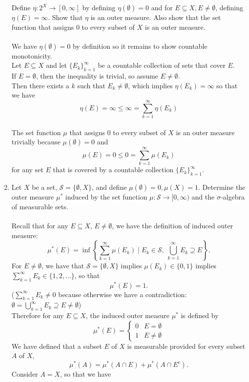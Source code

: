 \begin{enumerate}
	Define $\eta:2^X\to[0,\infty]$ by defining $\eta(\emptyset)=0$ and for $E\subseteq X,E\neq\emptyset$, defining $\eta(E)=\infty$.
	Show that $\eta$ is an outer measure.
	Also show that the set function that assigns $0$ to every subset of $X$ is an outer measure.\\
	\\We have $\eta(\emptyset)=0$ by definition so it remains to show countable monotonicity.
	\\Let $E\subseteq X$ and let $\{E_k\}_{k=1}^\infty$ be a countable collection of sets that cover $E$.
	\\If $E=\emptyset$, then the inequality is trivial, so assume $E\neq\emptyset$.
	\\Then there exists a $k$ such that $E_k\neq\emptyset$, which implies $\eta(E_k)=\infty$ so that we have 
	\[
		\eta(E)=\infty\le\infty=\sum_{k=1}^\infty\eta(E_k)
	\]
	\\The set function $\mu$ that assigns $0$ to every subset of $X$ is an outer measure trivially because $\mu(\emptyset)=0$ and
	\[
		\mu(E)=0\le0=\sum_{k=1}^\infty\mu(E_k)
	\]
	for any set $E$ that is covered by a countable collection $\{E_k\}_{k=1}^\infty$.
	\item Let $X$ be a set, $\mathcal{S}=\{\emptyset,X\}$, and define $\mu(\emptyset)=0,\mu(X)=1$. 
	Determine the outer measure $\mu^*$ induced by the set function $\mu:\mathcal{S}\to[0,\infty)$ and the $\sigma$-algebra of measurable sets.\\
	\\Recall that for any $E\subseteq X$, $E\neq\emptyset$, we have the definition of induced outer measure:
	\[
		\mu^*(E)=\inf\left\{\sum_{k=1}^\infty\mu(E_k)\mid E_k\in\mathcal{S},\ \bigcup_{k=1}^\infty E_k\supseteq E\right\}.
	\]
	For $E\neq\emptyset$, we have that $\mathcal{S}=\{\emptyset,X\}$ implies $\mu(E_k)\in\{0,1\}$ implies $\sum_{k=1}^\infty E_k\in\{1,2,\dots\}$, so that
	\[
		\mu^*(E)=1.
	\]
	($\sum_{k=1}^\infty E_k\neq0$ because otherwise we have a contradiction: $\emptyset=\bigcup_{k=1}^\infty E_k\supseteq E\neq\emptyset$)
	\\Therefore for any $E\subseteq X$, the induced outer measure $\mu^*$ is defined by
	\[
		\mu^*(E)=
		\begin{cases}
			0&E=\emptyset\\
			1&E\neq\emptyset
		\end{cases}
	\]
	We have defined that a subset $E$ of $X$ is measurable provided for every subset $A$ of $X$,
	\[
		\mu^*(A)=\mu^*(A\cap E)+\mu^*(A\cap E^c).
	\]
	Consider $A=X$, so that we have

\end{enumerate}
